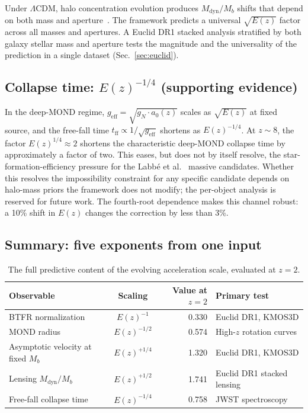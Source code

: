 \documentclass[
    aps,
    prd,
    reprint,
    superscriptaddress,
    nofootinbib,
    floatfix
]{revtex4-2}
\begin{document}
Under $\Lambda$CDM, halo concentration evolution produces
$M_\text{dyn}/M_b$ shifts that depend on both mass and
aperture~\cite{Moster2013, Duffy2008}. The framework predicts a
universal $\sqrt{E(z)}$ factor across all masses and apertures. A
Euclid DR1 stacked analysis stratified by both galaxy stellar mass
and aperture tests the magnitude and the universality of the
prediction in a single dataset (Sec.~\ref{sec:euclid}).

\subsection{Collapse time: $E(z)^{-1/4}$ (supporting evidence)}
\label{sec:collapse}

In the deep-MOND regime, $g_\text{eff} = \sqrt{g_N \cdot a_0(z)}$
scales as $\sqrt{E(z)}$ at fixed source, and the free-fall time
$t_\text{ff} \propto 1/\sqrt{g_\text{eff}}$ shortens as
$E(z)^{-1/4}$. At $z \sim 8$, the factor $E(z)^{1/4} \approx 2$
shortens the characteristic deep-MOND collapse time by approximately
a factor of two. This eases, but does not by itself resolve, the
star-formation-efficiency pressure for the Labb\'e et
al.~\cite{Labbe2023} massive candidates. Whether this resolves the
impossibility constraint for any specific candidate depends on
halo-mass priors the framework does not modify; the per-object
analysis is reserved for future work. The fourth-root dependence
makes this channel robust: a 10\% shift in $E(z)$ changes the
correction by less than 3\%.

\subsection{Summary: five exponents from one input}
\label{sec:summary}

\begin{table}[tb]
\caption{\label{tab:summary}The full predictive content of the
evolving acceleration scale, evaluated at $z = 2$.}
\begin{ruledtabular}
\begin{tabular}{lcrl}
Observable & Scaling & Value at $z = 2$ & Primary test \\
\hline
BTFR normalization                         & $E(z)^{-1}$
  & 0.330 & Euclid DR1, KMOS3D \\
MOND radius                                & $E(z)^{-1/2}$
  & 0.574 & High-$z$ rotation curves \\
Asymptotic velocity at fixed $M_b$         & $E(z)^{+1/4}$
  & 1.320 & Euclid DR1, KMOS3D \\
Lensing $M_\text{dyn}/M_b$                 & $E(z)^{+1/2}$
  & 1.741 & Euclid DR1 stacked lensing \\
Free-fall collapse time                    & $E(z)^{-1/4}$
  & 0.758 & JWST spectroscopy \\
\end{tabular}
\end{ruledtabular}
\end{table}
\end{document}
